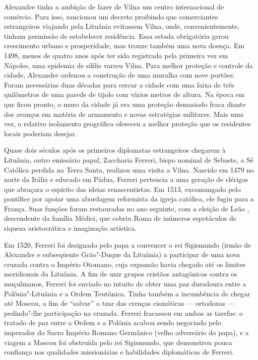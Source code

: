 Alexandre tinha a ambição de fazer de Vilna um centro internacional de
comércio. Para isso, sancionou um decreto proibindo que comerciantes
estrangeiros viajando pela Lituânia evitassem Vilna, onde,
convenientemente, tinham permissão de estabelecer residência. Essa
estada obrigatória gerou crescimento urbano e prosperidade, mas trouxe
também uma nova doença. Em 1498, menos de quatro anos após ter sido
registrada pela primeira vez em Nápoles, uma epidemia de sífilis varreu
Vilna. Para melhor proteção e controle da cidade, Alexandre ordenou a
construção de uma muralha com nove portões. Foram necessárias duas
décadas para cercar a cidade com uma faixa de três quilômetros de uma
parede de tijolo com vários metros de altura. Na época em que ficou
pronto, o muro da cidade já era uma proteção demasiado fraca diante dos
avanços em matéria de armamento e novas estratégias militares. Mais uma
vez, o relativo isolamento geográfico ofereceu a melhor proteção que os
residentes locais poderiam desejar.

Quase dois séculos após os primeiros diplomatas estrangeiros chegarem à
Lituânia, outro emissário papal, Zaccharia Ferreri, bispo nominal de
Sebaste, a Sé Católica perdida na Terra Santa, realizou uma visita a
Vilna. Nascido em 1479 no norte da Itália e educado em Pádua, Ferreri
pertencia a uma geração de clérigos que abraçara o espírito das ideias
renascentistas. Em 1513, excomungado pelo pontífice por apoiar uma
abordagem reformista da igreja católica, ele fugiu para a França. Suas
funções foram restauradas no ano seguinte, com a eleição de Leão ,
descendente da família Médici, que cobriu Roma de inúmeros espetáculos
de riqueza aristocrática e imaginação artística.

%

Em 1520, Ferreri foi designado pelo papa a convencer o rei Sigismundo
(irmão de Alexandre e subseqüente Grão"-Duque da Lituânia) a participar
de uma nova cruzada contra o Império Otomano, cuja expansão havia
chegado até os limites meridionais da Lituânia. A fim de unir grupos
cristãos antagônicos contra os muçulmanos, Ferreri foi enviado no
intuito de obter uma paz duradoura entre a Polônia"-Lituânia e a Ordem
Teutônica. Tinha também a incumbência de chegar até Moscou, a fim de
``salvar'' o tzar das crenças cismáticas --- ortodoxas --- pedindo"-lhe
participação na cruzada. Ferreri fracassou em ambas as tarefas: o
tratado de paz entre a Ordem e a Polônia acabou sendo negociado pelo
imperador do Sacro Império Romano Germânico (velho adversário do papa),
e a viagem a Moscou foi obstruída pelo rei Sigismundo, que demonstrou
pouca confiança nas qualidades missionárias e habilidades diplomáticas
de Ferreri.

